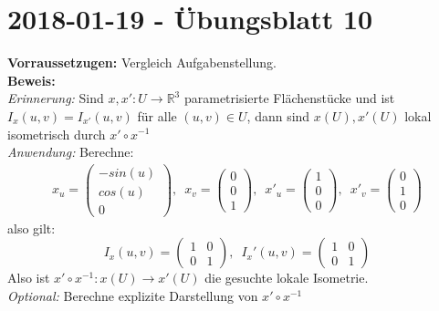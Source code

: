 \section{2018-01-19 - Übungsblatt 10} %
\label{sec:2018_01_19_übungsblatt_10}

\begin{problem*}[1]
\textbf{Vorraussetzugen:} Vergleich Aufgabenstellung. \\
\textbf{Beweis:} \\
\emph{Erinnerung:} Sind $ x, x': U \to \mathbb{R}^3 $ parametrisierte Flächenstücke und ist $I_x(u,v) = I_{ x' }(u,v)$ für alle $ (u,v) \in U $, dann sind $ x(U), x'(U) $ lokal isometrisch durch $ x' \circ x^{ -1 }$\\
\emph{Anwendung:} Berechne: \\
\begin{align*}
	x_u = \begin{pmatrix}	
	-sin(u)\\
	cos(u)\\
	0	
	\end{pmatrix},\enspace
	x_v= \begin{pmatrix}	
	0\\
	0\\
	1	
	\end{pmatrix},\enspace
		x'_u = \begin{pmatrix}	
	1\\
	0\\
	0	
	\end{pmatrix},\enspace
	x'_v= \begin{pmatrix}	
	0\\
	1\\
	0	
	\end{pmatrix}
\end{align*}
also gilt:
\begin{equation*}
	I_x(u,v) = \begin{pmatrix}
		1 & 0 \\
		0 & 1
	\end{pmatrix}, \enspace
		I_x'(u,v) = \begin{pmatrix}
		1 & 0 \\
		0 & 1
	\end{pmatrix}
\end{equation*}
Also ist $x' \circ x^{ -1 }: x(U) \to x'(U)$ die gesuchte lokale Isometrie.\\
\emph{Optional:} Berechne explizite Darstellung von $x' \circ x^{ -1 }$
\end{problem*}


